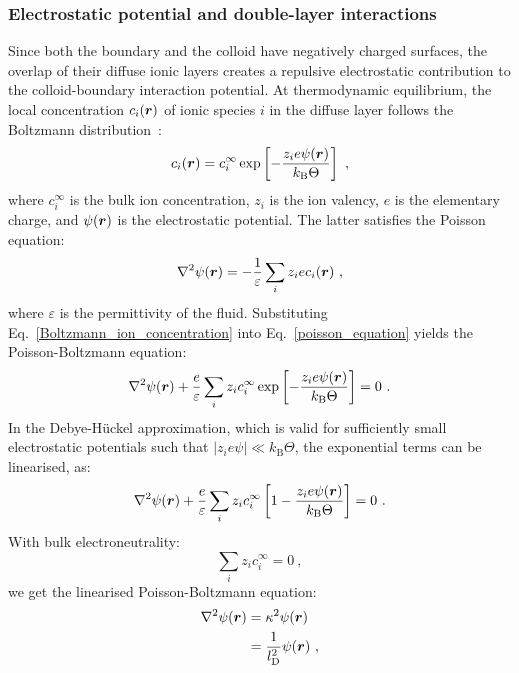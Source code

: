 \subsubsection{Electrostatic potential and double-layer interactions}
Since both the boundary and the colloid have negatively charged surfaces, the overlap of their diffuse ionic layers creates a repulsive electrostatic contribution to the colloid-boundary interaction potential. At thermodynamic equilibrium, the local concentration $c_i(\bm{r})$ of ionic species $i$ in the diffuse layer follows the Boltzmann distribution~\cite{Israelachvili2011,Hunter2001}:
\begin{equation}
c_i(\bm{r}) = c_i^\infty 
\exp\left[-\dfrac{z_i e \psi(\bm{r})}{k_\mathrm{B} \Theta}\right]~, 
\label{Boltzmann_ion_concentration}
\end{equation}
where $c_i^\infty$ is the bulk ion concentration, $z_i$ is the ion valency, $e$ is the elementary charge, and $\psi(\bm{r})$ is the electrostatic potential. The latter satisfies the Poisson equation:
\begin{equation}
\nabla^2 \psi(\bm{r}) = - \dfrac{1}{\varepsilon} \sum_i z_i e c_i(\bm{r})~,
\label{poisson_equation}
\end{equation}
where $\varepsilon$ is the permittivity of the fluid. Substituting Eq.~\eqref{Boltzmann_ion_concentration} into Eq.~\eqref{poisson_equation} yields the Poisson-Boltzmann equation:
\begin{equation}
    \nabla^2 \psi(\bm{r}) 
    + \dfrac{e}{\varepsilon} \sum_i z_i c^\infty_i 
    \exp \left[-\dfrac{z_i e \psi(\bm{r})}{k_\mathrm{B} \Theta} \right] = 0~.
    \label{Psi_full_equation}
\end{equation}
In the Debye-Hückel approximation, which is valid for sufficiently small electrostatic potentials such that $|z_i e \psi| \ll k_\mathrm{B}\Theta$, the exponential terms can be linearised, as:
\begin{equation}
    \nabla^2 \psi(\bm{r}) + \dfrac{e}{\varepsilon} \sum_i z_i c^\infty_i  \left[1 - \dfrac{z_i e \psi(\bm{r})}{k_\mathrm{B} \Theta} \right] = 0~.
    \label{Psi_taylor_expanded}
\end{equation}
With bulk electroneutrality:
\begin{equation}
    \sum_i z_i c^\infty_i = 0~,
\end{equation}
we get the linearised Poisson-Boltzmann equation:
\begin{align}
    \nabla^2 \psi(\bm{r})  &= \kappa^2 \psi(\bm{r})\\
    &= \dfrac{1}{l_\mathrm{D}^2}\psi(\bm{r})~,
    \label{lD_psi}
\end{align}
